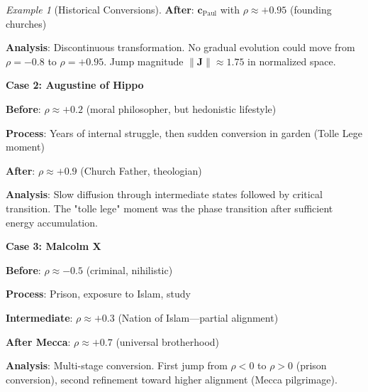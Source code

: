 \documentclass[11pt,a4paper]{article}
\theoremstyle{definition}
\theoremstyle{remark}
\newtheorem{example}{Example}[section]
\newcommand{\cc}{\mathbf{c}}
\begin{document}
\begin{small}
\begin{enumerate}
\begin{example}[Historical Conversions]
\textbf{After}: \(\cc_{\text{Paul}}\) with \(\rho \approx +0.95\) (founding churches)

\textbf{Analysis}: Discontinuous transformation. No gradual evolution could move from \(\rho = -0.8\) to \(\rho = +0.95\). Jump magnitude \(\|\mathbf{J}\| \approx 1.75\) in normalized space.

\textbf{Case 2: Augustine of Hippo}

\textbf{Before}: \(\rho \approx +0.2\) (moral philosopher, but hedonistic lifestyle)

\textbf{Process}: Years of internal struggle, then sudden conversion in garden (Tolle Lege moment)

\textbf{After}: \(\rho \approx +0.9\) (Church Father, theologian)

\textbf{Analysis}: Slow diffusion through intermediate states followed by critical transition. The "tolle lege" moment was the phase transition after sufficient energy accumulation.

\textbf{Case 3: Malcolm X}

\textbf{Before}: \(\rho \approx -0.5\) (criminal, nihilistic)

\textbf{Process}: Prison, exposure to Islam, study

\textbf{Intermediate}: \(\rho \approx +0.3\) (Nation of Islam—partial alignment)

\textbf{After Mecca}: \(\rho \approx +0.7\) (universal brotherhood)

\textbf{Analysis}: Multi-stage conversion. First jump from \(\rho < 0\) to \(\rho > 0\) (prison conversion), second refinement toward higher alignment (Mecca pilgrimage).
\end{example}

\begin{figure}[H]
\centering
{}
\end{figure}
\end{enumerate}
\end{small}
\end{document}
